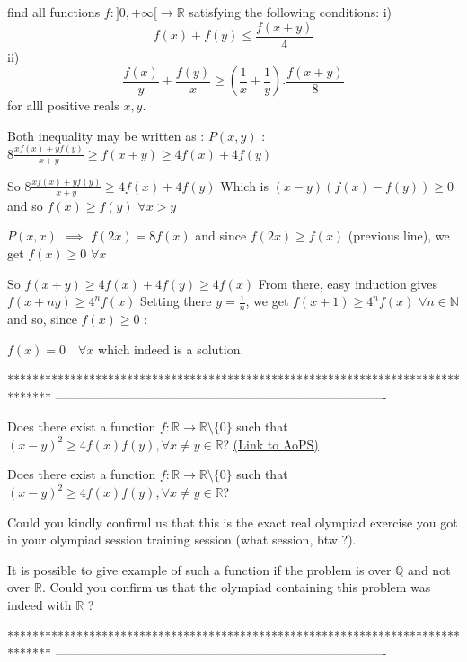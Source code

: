 \begin{solution}
	\begin{tcolorbox}find all functions $f:]0,+\infty[ \rightarrow \mathbb{R}$ satisfying the following conditions:
 i)$$f(x)+f(y) \leq \frac{f(x+y)}{4}$$
 ii)$$ \frac{f(x)}{y}+\frac{f(y)}{x} \geq (\frac{1}{x}+\frac{1}{y}) .\frac{f(x+y)}{8}$$
for alll positive reals $x,y$.\end{tcolorbox}
Both inequality may be written as :
$P(x,y)$ :  $8\frac{xf(x)+yf(y)}{x+y}\ge f(x+y)\ge 4f(x)+4f(y)$

So $8\frac{xf(x)+yf(y)}{x+y}\ge 4f(x)+4f(y)$
Which is $(x-y)(f(x)-f(y))\ge 0$ and so $f(x)\ge f(y)$ $\forall x>y$

$P(x,x)$ $\implies$ $f(2x)=8f(x)$ and since $f(2x)\ge f(x)$ (previous line), we get $f(x)\ge 0$ $\forall x$

So $f(x+y)\ge 4f(x)+4f(y)\ge 4f(x)$
From there, easy induction gives $f(x+ny)\ge 4^nf(x)$
Setting there $y=\frac 1n$, we get $f(x+1)\ge 4^nf(x)$ $\forall n\in\mathbb N$ and so, since $f(x)\ge 0$ :

$\boxed{f(x)=0\quad\forall x}$ which indeed is a solution.



\end{solution}
*******************************************************************************
-------------------------------------------------------------------------------

\begin{problem}
	Does there exist a function $f: \mathbb{R} \to \mathbb{R}\setminus\{0\}$ such that $(x-y)^2 \geq 4f(x)f(y), \forall x \neq y \in \mathbb{R}$?
	\flushright \href{https://artofproblemsolving.com/community/c6h1619679}{(Link to AoPS)}
\end{problem}



\begin{solution}
	\begin{tcolorbox}Does there exist a function $f: \mathbb{R} \to \mathbb{R}\setminus\{0\}$ such that $(x-y)^2 \geq 4f(x)f(y), \forall x \neq y \in \mathbb{R}$?\end{tcolorbox}
Could you kindly confirml us that this is the exact real olympiad exercise you got in your olympiad session \/ training session  (what session, btw ?).

It is possible to give example of such a function if the problem is over $\mathbb Q$ and not over $\mathbb R$. Could you confirm us that the olympiad containing this problem was indeed with $\mathbb R$ ?


\end{solution}
*******************************************************************************
-------------------------------------------------------------------------------

